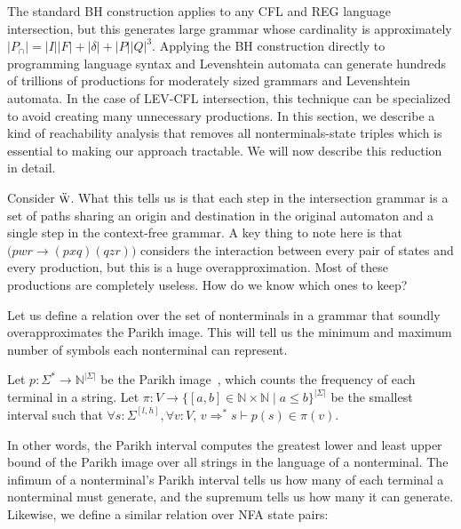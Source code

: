 \documentclass[sigplan,review,anonymous,acmsmall]{acmart}\settopmatter{printfolios=false,printccs=false,printacmref=false}
\begin{document}
  The standard BH construction applies to any CFL and REG language intersection, but this generates large grammar whose cardinality is approximately $|P_\cap|=|I||F| + |\delta| + |P||Q|^3$. Applying the BH construction directly to programming language syntax and Levenshtein automata can generate hundreds of trillions of productions for moderately sized grammars and Levenshtein automata. In the case of LEV-CFL intersection, this technique can be specialized to avoid creating many unnecessary productions. In this section, we describe a kind of reachability analysis that removes all nonterminals-state triples which is essential to making our approach tractable. We will now describe this reduction in detail.


  Consider $\textsc{\"w}$. What this tells us is that each step in the intersection grammar is a set of paths sharing an origin and destination in the original automaton and a single step in the context-free grammar. A key thing to note here is that $\big(pwr\rightarrow (pxq)(qzr)\big)$ considers the interaction between every pair of states and every production, but this is a huge overapproximation. Most of these productions are completely useless. How do we know which ones to keep?

  Let us define a relation over the set of nonterminals in a grammar that soundly overapproximates the Parikh image. This will tell us the minimum and maximum number of symbols each nonterminal can represent.

  \begin{definition}
    Let $p: \Sigma^*\rightarrow\mathbb{N}^{|\Sigma|}$ be the Parikh image~\cite{parikh1966context}, which counts the frequency of each terminal in a string. Let $\pi: V \rightarrow \{[a, b] \in \mathbb{N} \times \mathbb{N} \mid a \leq b\}^{|\Sigma|}$ be the smallest interval such that $\forall s: \Sigma^{[l, h]}, \forall v: V$, $v \Rightarrow^* s \vdash p(s) \in \pi(v)$.
  \end{definition}

  In other words, the Parikh interval computes the greatest lower and least upper bound of the Parikh image over all strings in the language of a nonterminal. The infimum of a nonterminal's Parikh interval tells us how many of each terminal a nonterminal must generate, and the supremum tells us how many it can generate. Likewise, we define a similar relation over NFA state pairs:
\end{document}
